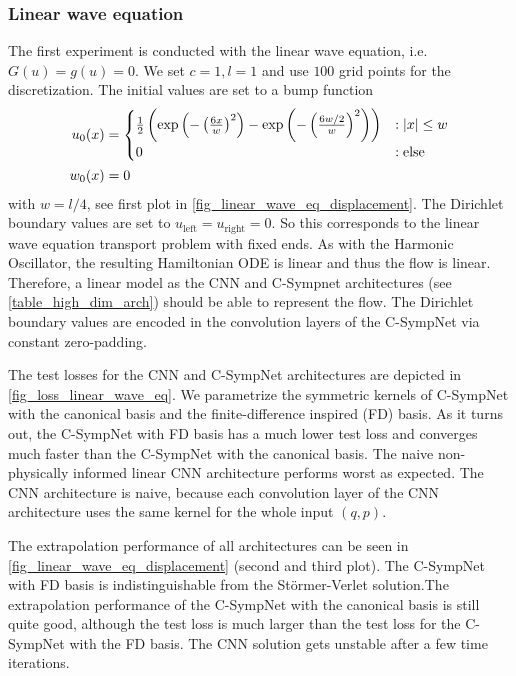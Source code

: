 \documentclass[twoside,a4paper]{article}
\begin{document}
\subsubsection{Linear wave equation}

The first experiment is conducted with the linear wave equation, i.e.
$G(u) = g(u) =0$. We set $c=1, l=1$ and use $100$ grid points for the discretization.
The initial values are set to a bump function
\begin{align*}
	u_0(x) &= \begin{cases}
	\frac{1}{2} \left( 
	\exp \left( - \left( \frac{6x}{w} \right)^2 \right) - \exp \left( - \left( \frac{6w/2}{w} \right)^2 \right) 
	\right) & : \left|{x}\right| \leq w \\
	0 & : \text{else}
	\end{cases} \\
	w_0(x) &= 0
\end{align*}
with $w = l/4$, see first plot in \cref{fig_linear_wave_eq_displacement}.
The Dirichlet boundary values are set to $u_{\text{left}} = u_{\text{right}} = 0$.
So this corresponds to the linear wave equation transport problem with fixed ends.
As with the Harmonic Oscillator, the resulting Hamiltonian ODE is linear and thus the
flow is linear. Therefore, a linear model as the CNN
and C-Sympnet architectures (see \cref{table_high_dim_arch}) should be able to represent the flow.
The Dirichlet boundary values are encoded in the convolution layers of the
C-SympNet via constant zero-padding.

The test losses for the CNN and C-SympNet architectures are depicted in
\cref{fig_loss_linear_wave_eq}. We parametrize the symmetric kernels of C-SympNet
with the canonical basis and the finite-difference inspired (FD) basis. As it turns out,
the C-SympNet with FD basis has a much lower test loss and converges much faster
than the C-SympNet with the canonical basis.
The naive non-physically informed linear CNN architecture performs worst as expected. 
The CNN architecture is naive, because each convolution
layer of the CNN architecture uses the same kernel for the whole input $(q,p)$.

The extrapolation performance of all architectures can be seen in
\cref{fig_linear_wave_eq_displacement} (second and third plot). The C-SympNet with FD basis
is indistinguishable from the Störmer-Verlet solution.The extrapolation performance of the C-SympNet
with the canonical basis is still quite good, although the test loss
is much larger than the test loss for the C-SympNet with the FD basis.
The CNN solution gets unstable after a few time iterations.
\end{document}
